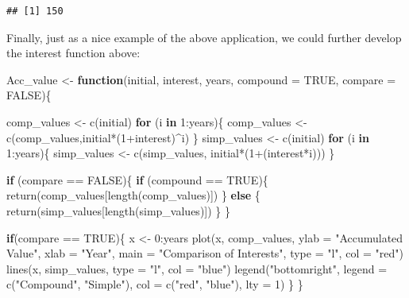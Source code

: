 \documentclass[
]{book}
\newenvironment{Shaded}{\begin{snugshade}}{\end{snugshade}}
\newcommand{\AttributeTok}[1]{\textcolor[rgb]{0.77,0.63,0.00}{#1}}
\newcommand{\ConstantTok}[1]{\textcolor[rgb]{0.00,0.00,0.00}{#1}}
\newcommand{\ControlFlowTok}[1]{\textcolor[rgb]{0.13,0.29,0.53}{\textbf{#1}}}
\newcommand{\DecValTok}[1]{\textcolor[rgb]{0.00,0.00,0.81}{#1}}
\newcommand{\FunctionTok}[1]{\textcolor[rgb]{0.00,0.00,0.00}{#1}}
\newcommand{\NormalTok}[1]{#1}
\newcommand{\OtherTok}[1]{\textcolor[rgb]{0.56,0.35,0.01}{#1}}
\newcommand{\SpecialCharTok}[1]{\textcolor[rgb]{0.00,0.00,0.00}{#1}}
\newcommand{\StringTok}[1]{\textcolor[rgb]{0.31,0.60,0.02}{#1}}
\theoremstyle{definition}
\theoremstyle{definition}
\theoremstyle{definition}
\theoremstyle{definition}
\theoremstyle{remark}
\begin{document}
\begin{verbatim}
## [1] 150
\end{verbatim}

Finally, just as a nice example of the above application, we could further develop the interest function above:

\begin{Shaded}
\begin{Highlighting}[]
\NormalTok{Acc\_value }\OtherTok{\textless{}{-}} \ControlFlowTok{function}\NormalTok{(initial, interest, years, }\AttributeTok{compound =} \ConstantTok{TRUE}\NormalTok{, }\AttributeTok{compare =} \ConstantTok{FALSE}\NormalTok{)\{}
  
\NormalTok{    comp\_values }\OtherTok{\textless{}{-}} \FunctionTok{c}\NormalTok{(initial)}
    \ControlFlowTok{for}\NormalTok{ (i }\ControlFlowTok{in} \DecValTok{1}\SpecialCharTok{:}\NormalTok{years)\{}
\NormalTok{    comp\_values }\OtherTok{\textless{}{-}} \FunctionTok{c}\NormalTok{(comp\_values,initial}\SpecialCharTok{*}\NormalTok{(}\DecValTok{1}\SpecialCharTok{+}\NormalTok{interest)}\SpecialCharTok{\^{}}\NormalTok{i)}
\NormalTok{    \}}
\NormalTok{    simp\_values }\OtherTok{\textless{}{-}} \FunctionTok{c}\NormalTok{(initial)}
    \ControlFlowTok{for}\NormalTok{ (i }\ControlFlowTok{in} \DecValTok{1}\SpecialCharTok{:}\NormalTok{years)\{}
\NormalTok{      simp\_values }\OtherTok{\textless{}{-}} \FunctionTok{c}\NormalTok{(simp\_values, initial}\SpecialCharTok{*}\NormalTok{(}\DecValTok{1}\SpecialCharTok{+}\NormalTok{(interest}\SpecialCharTok{*}\NormalTok{i)))}
\NormalTok{    \}}
    
    \ControlFlowTok{if}\NormalTok{ (compare }\SpecialCharTok{==} \ConstantTok{FALSE}\NormalTok{)\{}
      \ControlFlowTok{if}\NormalTok{ (compound }\SpecialCharTok{==} \ConstantTok{TRUE}\NormalTok{)\{}
        \FunctionTok{return}\NormalTok{(comp\_values[}\FunctionTok{length}\NormalTok{(comp\_values)])}
\NormalTok{      \} }\ControlFlowTok{else}\NormalTok{ \{}
        \FunctionTok{return}\NormalTok{(simp\_values[}\FunctionTok{length}\NormalTok{(simp\_values)])}
\NormalTok{      \}}
\NormalTok{    \}}
    
    \ControlFlowTok{if}\NormalTok{(compare }\SpecialCharTok{==} \ConstantTok{TRUE}\NormalTok{)\{}
\NormalTok{      x }\OtherTok{\textless{}{-}} \DecValTok{0}\SpecialCharTok{:}\NormalTok{years}
      \FunctionTok{plot}\NormalTok{(x, comp\_values, }\AttributeTok{ylab =} \StringTok{"Accumulated Value"}\NormalTok{, }\AttributeTok{xlab =} \StringTok{"Year"}\NormalTok{, }\AttributeTok{main =} \StringTok{"Comparison of Interests"}\NormalTok{, }\AttributeTok{type =} \StringTok{"l"}\NormalTok{, }\AttributeTok{col =} \StringTok{"red"}\NormalTok{)}
      \FunctionTok{lines}\NormalTok{(x, simp\_values, }\AttributeTok{type =} \StringTok{"l"}\NormalTok{, }\AttributeTok{col =} \StringTok{"blue"}\NormalTok{)}
      \FunctionTok{legend}\NormalTok{(}\StringTok{"bottomright"}\NormalTok{, }\AttributeTok{legend =} \FunctionTok{c}\NormalTok{(}\StringTok{"Compound"}\NormalTok{, }\StringTok{"Simple"}\NormalTok{), }\AttributeTok{col =} \FunctionTok{c}\NormalTok{(}\StringTok{"red"}\NormalTok{, }\StringTok{"blue"}\NormalTok{), }\AttributeTok{lty =} \DecValTok{1}\NormalTok{)}
\NormalTok{    \}}
\NormalTok{\}}


\end{Highlighting}
\end{Shaded}
\end{document}
